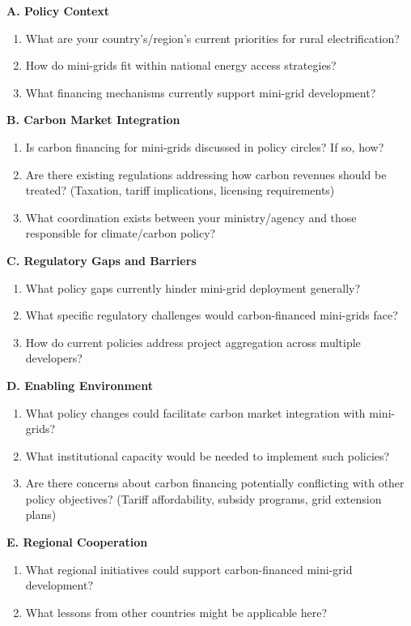\textbf{A. Policy Context}
\begin{enumerate}
	\item What are your country's/region's current priorities for rural electrification?
	\item How do mini-grids fit within national energy access strategies?
	\item What financing mechanisms currently support mini-grid development?
\end{enumerate}

\textbf{B. Carbon Market Integration}
\begin{enumerate}[resume]
	\item Is carbon financing for mini-grids discussed in policy circles? If so, how?
	\item Are there existing regulations addressing how carbon revenues should be treated? (Taxation, tariff implications, licensing requirements)
	\item What coordination exists between your ministry/agency and those responsible for climate/carbon policy?
\end{enumerate}

\textbf{C. Regulatory Gaps and Barriers}
\begin{enumerate}[resume]
	\item What policy gaps currently hinder mini-grid deployment generally?
	\item What specific regulatory challenges would carbon-financed mini-grids face?
	\item How do current policies address project aggregation across multiple developers?
\end{enumerate}

\textbf{D. Enabling Environment}
\begin{enumerate}[resume]
	\item What policy changes could facilitate carbon market integration with mini-grids?
	\item What institutional capacity would be needed to implement such policies?
	\item Are there concerns about carbon financing potentially conflicting with other policy objectives? (Tariff affordability, subsidy programs, grid extension plans)
\end{enumerate}

\textbf{E. Regional Cooperation}
\begin{enumerate}[resume]
	\item What regional initiatives could support carbon-financed mini-grid development?
	\item What lessons from other countries might be applicable here?
\end{enumerate}

